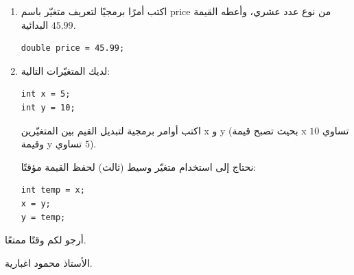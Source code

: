 \documentclass[14pt]{extarticle}
\begin{document}
\begin{enumerate}[resume, itemsep=2em]
\item
اكتب أمرًا برمجيًا لتعريف متغيّر باسم \textenglish{price} من نوع عدد عشري، وأعطه القيمة البدائية $45.99$.
\ifwithsols
\begin{boxSolution}
\begin{english}
\begin{verbatim}
double price = 45.99;
\end{verbatim}
\end{english}
\end{boxSolution}
\fi

\item
لديك المتغيّرات التالية:
\begin{english}
\begin{verbatim}
int x = 5;
int y = 10;
\end{verbatim}
\end{english}
اكتب أوامر برمجية لتبديل القيم بين المتغيّرين \textenglish{x} و \textenglish{y} (بحيث تصبح قيمة \textenglish{x} تساوي $10$ وقيمة \textenglish{y} تساوي $5$).
\ifwithsols
\begin{boxSolution}
نحتاج إلى استخدام متغيّر وسيط (ثالث) لحفظ القيمة مؤقتًا:
\begin{english}
\begin{verbatim}
int temp = x;
x = y;
y = temp;
\end{verbatim}
\end{english}
\end{boxSolution}
\fi

\end{enumerate}

\vspace{3cm}
\begin{flushleft}
أرجو لكم وقتًا ممتعًا.

الأستاذ محمود اغبارية.
\end{flushleft}
\end{document}
